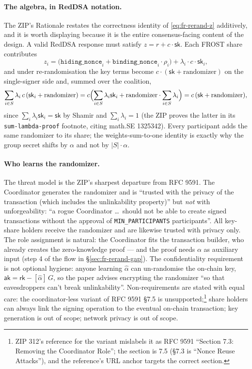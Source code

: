 \documentclass[11pt,a4paper]{article}
\theoremstyle{definition}
\newcommand{\rk}{\mathsf{rk}}
\newcommand{\aksym}{\ensuremath{\mathsf{ak}}}
\begin{document}
\paragraph{The algebra, in RedDSA notation.} The ZIP's Rationale
restates the correctness identity of \eqref{eq:fr-rerand-z} additively,
and it is worth displaying because it is the entire consensus-facing
content of the design. A valid RedDSA response must satisfy
$z = r + c \cdot \mathsf{sk}$. Each FROST share contributes
\[
z_i = \bigl(\mathtt{hiding\_nonce}_i
      + \mathtt{binding\_nonce}_i \cdot \rho_i\bigr)
      + \lambda_i \cdot c \cdot \mathsf{sk}_i ,
\]
and under re-randomisation the key terms become
$c \cdot (\mathsf{sk} + \mathrm{randomizer})$ on the single-signer side
and, summed over the coalition,
\[
\sum_{i \in S} \lambda_i \, c \, (\mathsf{sk}_i + \mathrm{randomizer})
= c \Bigl( \sum_{i \in S} \lambda_i \mathsf{sk}_i
  + \mathrm{randomizer} \cdot \sum_{i \in S} \lambda_i \Bigr)
= c \, (\mathsf{sk} + \mathrm{randomizer}),
\]
since $\sum_i \lambda_i \mathsf{sk}_i = \mathsf{sk}$ by Shamir and
$\sum_i \lambda_i = 1$ (the ZIP proves the latter in its
\texttt{sum-lambda-proof} footnote, citing math.SE 1325342). Every
participant adds the same randomizer to its share; the
weights-sum-to-one identity is exactly why the group secret shifts by
$\alpha$ and not by $|S| \cdot \alpha$.

\paragraph{Who learns the randomizer.} The threat model is the ZIP's
sharpest departure from RFC 9591. The Coordinator generates the
randomizer and is ``trusted with the privacy of the transaction (which
includes the unlinkability property)'' but \emph{not} with
unforgeability: ``a rogue Coordinator \ldots\ should not be able to
create signed transactions without the approval of
\texttt{MIN\_PARTICIPANTS} participants''. All key-share holders receive
the randomizer and are likewise trusted with privacy only. The role
assignment is natural: the Coordinator fits the transaction builder, who
already creates the zero-knowledge proof --- and the proof needs
$\alpha$ as auxiliary input (step 4 of the flow in
\S\ref{sec:fr-rerand-gap}). The confidentiality requirement is not
optional hygiene: anyone learning $\hat{\alpha}$ can un-randomise the
on-chain key, $\aksym = \rk - [\hat{\alpha}]\,G$, so the
paper advises encrypting the randomizer ``so that eavesdroppers can't
break unlinkability''. Non-requirements are stated with equal care: the
coordinator-less variant of RFC 9591 \S7.5 is unsupported;\footnote{ZIP
312's reference for the variant mislabels it as RFC 9591 ``Section 7.3:
Removing the Coordinator Role''; the section is 7.5 (\S7.3 is ``Nonce
Reuse Attacks''), and the reference's URL anchor targets the correct
section.} share holders
can always link the signing operation to the eventual on-chain
transaction; key generation is out of scope; network privacy is out of
scope.
\end{document}
